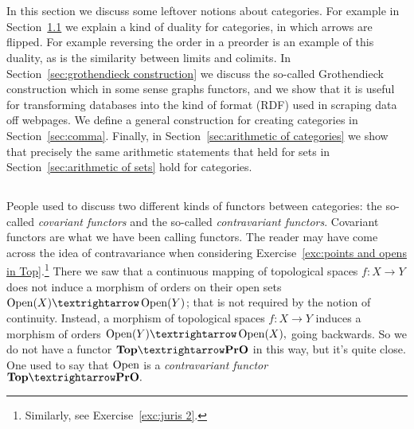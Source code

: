 \documentclass[../main/CT4S-EN-RU]{subfiles}
\begin{document}
\section{}

\begin{blockENG}
In this section we discuss some leftover notions about categories. For example in Section~\ref{sec:opposite} we explain a kind of duality for categories, in which arrows are flipped. For example reversing the order in a preorder is an example of this duality, as is the similarity between limits and colimits. In Section~\ref{sec:grothendieck construction} we discuss the so-called Grothendieck construction which in some sense graphs functors, and we show that it is useful for transforming databases into the kind of format (RDF) used in scraping data off webpages. We define a general construction for creating categories in Section~\ref{sec:comma}. Finally, in Section~\ref{sec:arithmetic of categories} we show that precisely the same arithmetic statements that held for sets in Section~\ref{sec:arithmetic of sets} hold for categories. 
\end{blockENG}

\begin{blockRUS}
\end{blockRUS}


\subsection{}\label{sec:opposite}

\begin{blockENG}
People used to discuss two different kinds of functors between categories: the so-called {\em covariant functors} and the so-called {\em contravariant functors}. Covariant functors are what we have been calling functors. The reader may have come across the idea of contravariance when considering Exercise~\ref{exc:points and opens in Top}.\footnote{Similarly, see Exercise~\ref{exc:juris 2}.} There we saw that a continuous mapping of topological spaces $f\colon X{→} Y$ does not induce a morphism of orders on their open sets $\Op(X){→}\Op(Y)$; that is not required by the notion of continuity. Instead, a morphism of topological spaces $f\colon X{→} Y$ induces a morphism of orders $\Op(Y){→}\Op(X),$ going backwards. So we do not have a functor $\Top{→}\PrO$ in this way, but it's quite close. One used to say that $\operatorname{Open}$ is a {\em contravariant functor} $\Top{→}\PrO.$
\end{blockENG}
\end{document}
